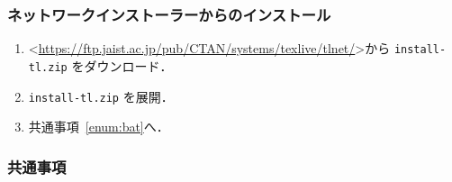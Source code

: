 \subsubsection*{ネットワークインストーラーからのインストール}

\begin{enumerate}
    \item \textless\url{https://ftp.jaist.ac.jp/pub/CTAN/systems/texlive/tlnet/}\textgreater から \verb|install-tl.zip| をダウンロード．
    \item \verb|install-tl.zip| を展開．
    \item 共通事項~\ref{enum:bat}へ．
\end{enumerate}

\subsubsection*{共通事項}


